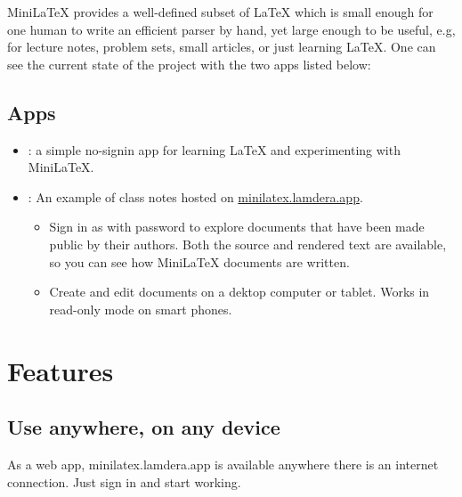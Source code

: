 MiniLaTeX provides a  well-defined subset of LaTeX which is small enough for one human to write an efficient parser by hand, yet large enough to be useful, e.g, for lecture notes, problem sets, small articles, or just learning LaTeX.  One can see the current state of the project with the two apps listed below:


\subsection{Apps}

\begin{itemize}

\item {}: a simple no-signin app for learning LaTeX and experimenting with MiniLaTeX.

\item {}:  An example of class notes hosted on
\href{https://minilatex.lamdera.app}{minilatex.lamdera.app}.

\begin{itemize}

\item {} Sign in as  with password  to explore documents that have been made public by their authors.  Both the source and rendered text are available, so you can see how MiniLaTeX documents are written.

\item {} Create and edit documents on a dektop computer or tablet. Works in read-only mode on smart phones.

\end{itemize}


\end{itemize}


\section{Features}


\subsection{Use anywhere, on any  device}

As a web app, minilatex.lamdera.app is available anywhere there is an internet connection.  Just sign in and start working.

